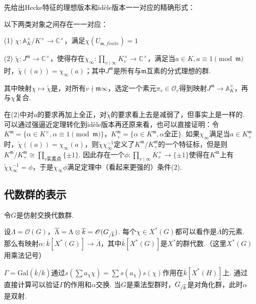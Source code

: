 先给出Hecke特征的理想版本和idèle版本一一对应的精确形式：

\begin{cthm}
    以下两类对象之间存在一一对应：

    (1) $\chi: \mathbb{A}_K^{\times}/K^{\times} \to \mathbb{C}^{\times}$，满足$\chi(U_{\mathfrak{m}, finite}) = 1$

    (2) $\tilde{\chi}: J^{\mathfrak{m}}\to \mathbb{C}^{\times}$，使得存在$\chi_{\infty}:\prod_{v\mid \infty}K_v^{\times} \to \mathbb{C}^{\times}$，满足当$a\in K, a\equiv 1\pmod{\mathfrak{m}}$时，$\tilde{\chi}((a)) = \chi_{\infty}(a)$；其中$J^{\mathfrak{m}}$是所有与$\mathfrak{m}$互素的分式理想的群.

    其中映射$\chi\mapsto \tilde{\chi}$是，对所有$v\nmid \mathfrak{m}\infty$，选定一个素元$\pi_v\in \mathcal{O}_v$得到映射$J^{\mathfrak{m}}\to \mathbb{A}_K^{\times}$，再与$\chi$复合.
\end{cthm}

\begin{crem}
    在(2)中对$a$的要求再加上全正，对$\tilde{\chi}$的要求看上去是减弱了，但事实上是一样的. 可以通过强逼近定理转化到idèle版本再还原来看，也可以直接证明：令$K^{\mathfrak{m}} = \{\alpha\in K^{\times}, \alpha\equiv 1\pmod{\mathfrak{m}}\}$，$K^{\mathfrak{m}}_{+} = \{\alpha\in K^{\mathfrak{m}}, \alpha \text{全正}\}$. 如果$\chi_{\infty}$满足当$a\in K^{\mathfrak{m}}_{+}$时，$\tilde{\chi}((a)) = \chi_{\infty}(a)$，则$\tilde{\chi}\chi_{\infty}^{-1}$定义了$K^{\mathfrak{m}}/K^{\mathfrak{m}}_{+}$的一个特征标，但是则$K^{\mathfrak{m}}/K^{\mathfrak{m}}_{+} \cong \prod_{v实素点} \{\pm 1\}$. 因此存在一个$\phi: \prod_{v\mid \infty} K_v^{\times}\to \{\pm 1\}$使得在$K^{\mathfrak{m}}$上有$\tilde{\chi}\chi_{\infty}^{-1} = \phi$，于是$\chi_{\infty}\phi$满足定理中（看起来更强的）条件(2).
\end{crem}


\subsection{代数群的表示}

令$G$是仿射交换代数群.

设$\Lambda = \mathscr{O}(G)$，$\overline{\Lambda} = \Lambda \otimes \overline{k} = \mathscr{O}({G}_{/\overline{k}})$.
每个$\chi\in X^{*}(G)$都可以看作是$\overline{\Lambda}$的元素.
那么有映射$\alpha: \overline{k}[X^{*}(G)] \to \overline{\Lambda}$，其中$\overline{k}[X^{*}(G)]$是$X^{*}$的群代数.（这里$X^{*}(G)$用乘法记号）

$\Gamma = \mathrm{Gal}(\overline{k}/k)$通过$s(\sum a_{\chi} \chi) = \sum s(a_{\chi}) s(\chi)$作用在$\overline{k}[X^{*}(H)]$上.
通过直接计算可以验证$\Gamma$的作用和$\alpha$交换.
当$G$是乘法型群时，${G}_{/\overline{k}}$是对角化群，此时$\alpha$是双射.

